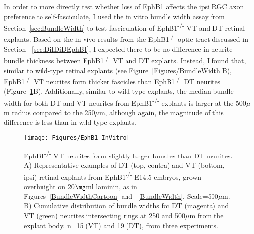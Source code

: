 \label{sec:EphB1invitro}
In order to more directly test whether loss of EphB1 affects the ipsi RGC axon preference to self-fasciculate, I used the in vitro bundle width assay from Section~\ref{sec:BundleWidth} to test fasciculation of EphB1\textsuperscript{-/-} VT and DT retinal explants.
Based on the in vivo results from the EphB1\textsuperscript{-/-} optic tract discussed in Section ~\ref{sec:DiIDiDEphB1}, I expected there to be no difference in neurite bundle thickness between EphB1\textsuperscript{-/-} VT and DT explants.
Instead, I found that, similar to wild-type retinal explants (see Figure~\ref{Figures/BundleWidth}B), EphB1\textsuperscript{-/-} VT neurites form thicker fascicles than EphB1\textsuperscript{-/-} DT neurites (Figure~\ref{EphB1InVitro}B).
Additionally, similar to wild-type explants, the median bundle width for both DT and VT neurites from EphB1\textsuperscript{-/-} explants is larger at the 500$\mu$m radius compared to the 250$\mu$m, although again, the magnitude of this difference is less than in wild-type explants.

\begin{figure}[hbtp]
    \begin{center}
        \texttt{[image: Figures/EphB1\_InVitro]}
        \caption[EphB1\textsuperscript{-/-} VT neurites form slightly larger bundles than DT neurites.]
        {EphB1\textsuperscript{-/-} VT neurites form slightly larger bundles than DT neurites.
		A) Representative examples of DT (top, contra) and VT (bottom, ipsi) retinal explants from EphB1\textsuperscript{-/-} E14.5 embryos, grown overhnight on 20$\mg$ml laminin, as in Figures~\ref{BundleWidthCartoon} and ~\ref{BundleWidth}.
		Scale=500$\mu$m.
		B) Cumulative distribution of bundle widths for DT (magenta) and VT (green) neurites intersecting rings at 250 and 500$\mu$m from the explant body. 
		n=15 (VT) and 19 (DT), from three experiments.
		}
        \label{EphB1InVitro}
    \end{center}
\end{figure}